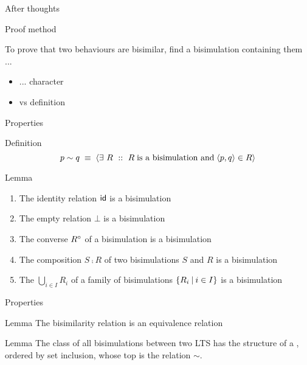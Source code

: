 \documentclass{beamer}
\begin{document}
\begin{slide}{After thoughts}
\small

\begin{block}{Proof method}

To prove that two behaviours are bisimilar, find a bisimulation containing them ...



\begin{itemize}
\item
...  character
\item {} vs  definition
\end{itemize}
\end{block}
\end{slide}

\begin{slide}{Properties}
\small

\begin{block}{Definition}
\[p \sim q\; \equiv\; \rcb{\exists}{R}{}{R\; \text{is a bisimulation and}\; \pair{p,q} \in R} 
\]
\end{block}
\begin{block}{Lemma}
\begin{enumerate}
\item The identity relation $\mathbin{\textsf{id}}$ is a bisimulation
\item The empty relation $\bot$ is a bisimulation
\item The converse $R^{\circ}$ of a bisimulation is a bisimulation
\item The composition $S \comp R$ of two bisimulations $S$ and $R$ is a bisimulation
\item The $\bigcup_{i \in I} R_i$ of a family of bisimulations
 $\mathopen{\{} R_i \mathbin{|} i \in I \mathclose{\}}$ is a bisimulation
\end{enumerate}
\end{block}
\end{slide}

\begin{slide}{Properties}

\small


\begin{block}{Lemma}
The bisimilarity relation is an equivalence relation\\
\end{block}

\begin{block}{Lemma}
The class of all bisimulations between two LTS has the structure of a 
, ordered by set inclusion, whose top is the   relation $\sim$.
\end{block}
\end{slide}
\end{document}
